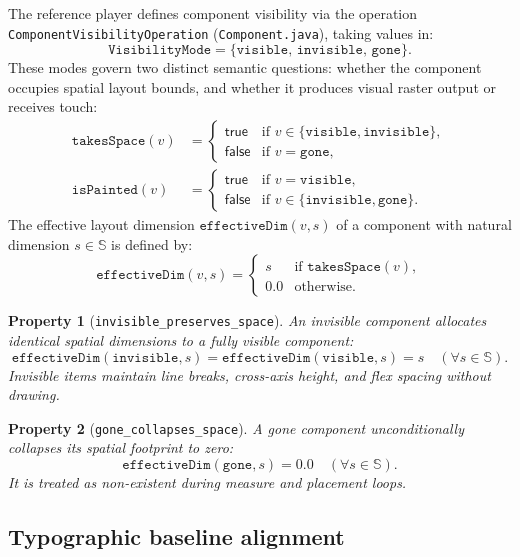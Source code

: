 \documentclass[11pt,a4paper]{article}
\newcommand{\Sc}{\mathbb{S}}
\newcommand{\lo}[1]{\texttt{#1}}       %
\newcommand{\jv}[1]{\texttt{#1}}       %
\theoremstyle{definition}
\theoremstyle{plain}
\newtheorem{property}{Property}[section]
\theoremstyle{remark}
\begin{document}
The reference player defines component visibility via the operation
\jv{ComponentVisibilityOperation} (\jv{Component.java}), taking values in:
\[
  \lo{VisibilityMode} = \{\lo{visible},\, \lo{invisible},\, \lo{gone}\}.
\]
These modes govern two distinct semantic questions: whether the component occupies
spatial layout bounds, and whether it produces visual raster output or receives touch:
\begin{align*}
  \lo{takesSpace}(v) &= \begin{cases}
    \textsf{true}  & \text{if } v \in \{\lo{visible}, \lo{invisible}\}, \\
    \textsf{false} & \text{if } v = \lo{gone},
  \end{cases} \\
  \lo{isPainted}(v) &= \begin{cases}
    \textsf{true}  & \text{if } v = \lo{visible}, \\
    \textsf{false} & \text{if } v \in \{\lo{invisible}, \lo{gone}\}.
  \end{cases}
\end{align*}
The effective layout dimension $\lo{effectiveDim}(v, s)$ of a component with
natural dimension $s \in \Sc$ is defined by:
\[
  \lo{effectiveDim}(v, s) = \begin{cases}
    s   & \text{if } \lo{takesSpace}(v), \\
    0.0 & \text{otherwise.}
  \end{cases}
\]

\begin{property}[\lo{invisible\_preserves\_space}]
An invisible component allocates identical spatial dimensions to a fully visible component:
\[
  \lo{effectiveDim}(\lo{invisible}, s) = \lo{effectiveDim}(\lo{visible}, s) = s \quad (\forall s \in \Sc).
\]
Invisible items maintain line breaks, cross-axis height, and flex spacing without drawing.
\end{property}

\begin{property}[\lo{gone\_collapses\_space}]
A gone component unconditionally collapses its spatial footprint to zero:
\[
  \lo{effectiveDim}(\lo{gone}, s) = 0.0 \quad (\forall s \in \Sc).
\]
It is treated as non-existent during measure and placement loops.
\end{property}

\subsection{Typographic baseline alignment}
\label{sec:mod-baseline}
\end{document}
